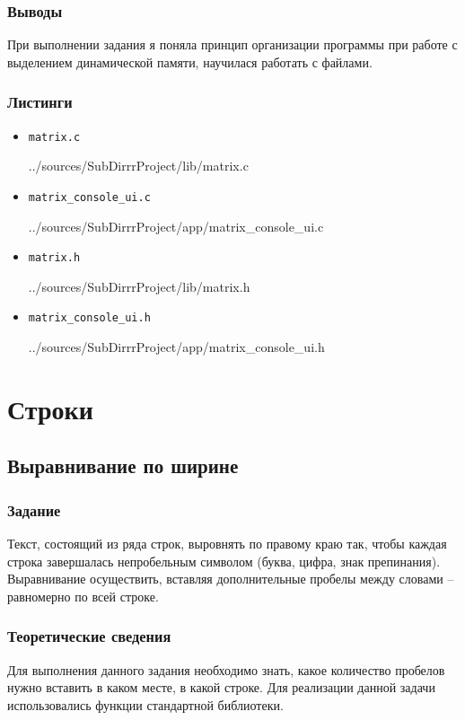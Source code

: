 \documentclass[12pt,a4paper]{report}
\begin{document}
\subsection{Выводы}
\hspace{\parindent}
При выполнении задания я поняла принцип организации программы при работе с выделением динамической памяти, научилася работать с файлами.

\subsection*{Листинги}
\begin{itemize}
\item[] \verb-matrix.c-

{../sources/SubDirrrProject/lib/matrix.c}
\item[] \verb-matrix_console_ui.c-

{../sources/SubDirrrProject/app/matrix_console_ui.c}
\item[] \verb-matrix.h-

{../sources/SubDirrrProject/lib/matrix.h}
\item[] \verb-matrix_console_ui.h-

{../sources/SubDirrrProject/app/matrix_console_ui.h}
\end{itemize}


%
\chapter{Строки}
\section{Выравнивание по ширине}
\subsection{Задание}
\hspace{\parindent}
Текст, состоящий из ряда строк, выровнять по правому краю так, чтобы каждая строка завершалась непробельным символом (буква, цифра, знак препинания). Выравнивание осуществить, вставляя дополнительные пробелы между словами – равномерно по всей строке.
\subsection{Теоретические сведения}
\hspace{\parindent}
Для выполнения данного задания необходимо знать, какое количество пробелов нужно вставить в каком месте, в какой строке. Для реализации данной задачи использовались функции стандартной библиотеки. 
\end{document}
